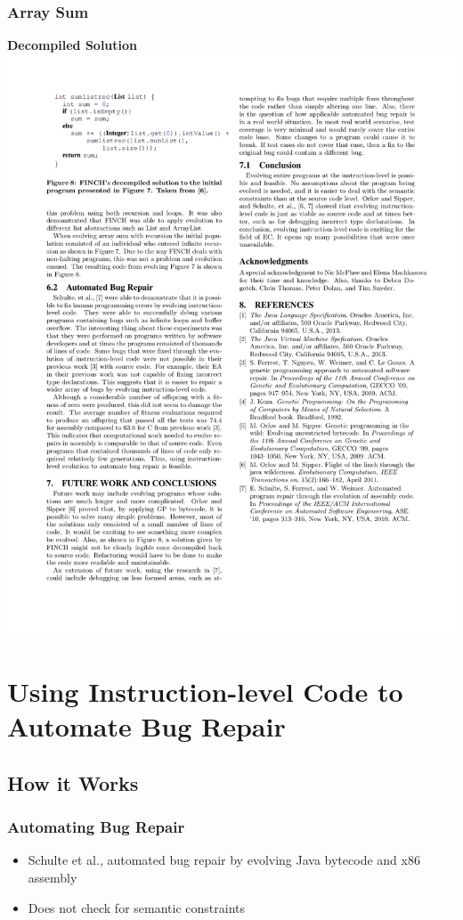 \documentclass{beamer}
\begin{document}
\begin{frame}
\frametitle{Array Sum}
\begin{center}
\textbf{Decompiled Solution} 
\\
\includegraphics[height=.38\textheight]{Illustrations/solutionRec.pdf}
\end{center}


\end{frame}












\section[Evolving Assembly]{Using Instruction-level Code to Automate Bug Repair}

\subsection{How it Works}
\begin{frame}
  \frametitle{Automating Bug Repair}
  \begin{itemize}
  \item Schulte et al., automated bug repair by evolving Java bytecode and x86 assembly
  \item Does not check for semantic constraints 


  \end{itemize}
\end{frame}
\end{document}

